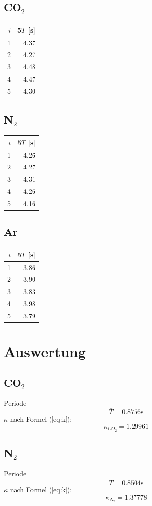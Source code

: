 \documentclass[12pt,a4paper]{article}
\begin{document}
\subsection*{CO$_2$}
\begin{tabular}{|r|r|}
\hline
$i$&5$T$ [s]\\
\hline
1&4.37 \\
2&4.27 \\
3&4.48 \\
4&4.47 \\
5&4.30 \\
\hline
\end{tabular}

\subsection*{N$_2$}
\begin{tabular}{|r|r|}
\hline
$i$&5$T$ [s]\\
\hline
1&4.26 \\
2&4.27 \\
3&4.31 \\
4&4.26 \\
5&4.16 \\
\hline
\end{tabular}

\subsection*{Ar}
\begin{tabular}{|r|r|}
\hline
$i$&5$T$ [s]\\
\hline
1&3.86 \\
2&3.90 \\
3&3.83 \\
4&3.98 \\
5&3.79 \\
\hline
\end{tabular}

\section*{Auswertung}
\subsection*{CO$_2$}
Periode
\[ \overline{T} = 0.8756\mbox{s} \]
$\kappa$ nach Formel (\ref{eq:k}):
\[ \kappa_{CO_2} = 1.29961 \]

\subsection*{N$_2$}
Periode
\[ \overline{T} = 0.8504\mbox{s} \]
$\kappa$ nach Formel (\ref{eq:k}):
\[ \kappa_{N_2} = 1.37778 \]
\end{document}
